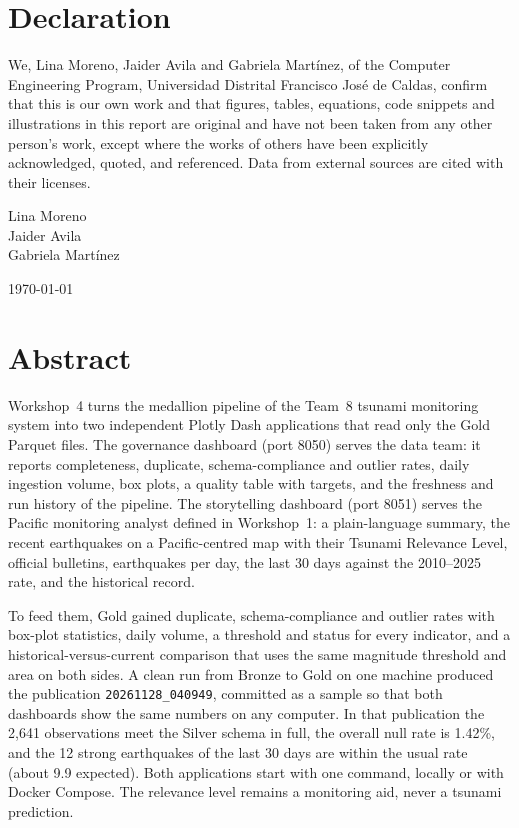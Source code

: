 \documentclass[a4paper,11pt,oneside]{book}
\begin{document}
    \newpage
    \thispagestyle{empty}
    \chapter*{\Large Declaration}
    We, Lina Moreno, Jaider Avila and Gabriela Mart\'inez, of the Computer Engineering Program, Universidad Distrital Francisco Jos\'e de Caldas, confirm that this is our own work and that figures, tables, equations, code snippets and illustrations in this report are original and have not been taken from any other person's work, except where the works of others have been explicitly acknowledged, quoted, and referenced. Data from external sources are cited with their licenses.
    ~\\[1cm]
    \begin{flushright}
    Lina Moreno\\
    Jaider Avila\\
    Gabriela Mart\'inez

    \today
    \end{flushright}

    \chapter*{Abstract}
Workshop~4 turns the medallion pipeline of the Team~8 tsunami monitoring system into two independent Plotly Dash applications that read only the Gold Parquet files. The governance dashboard (port 8050) serves the data team: it reports completeness, duplicate, schema-compliance and outlier rates, daily ingestion volume, box plots, a quality table with targets, and the freshness and run history of the pipeline. The storytelling dashboard (port 8051) serves the Pacific monitoring analyst defined in Workshop~1: a plain-language summary, the recent earthquakes on a Pacific-centred map with their Tsunami Relevance Level, official bulletins, earthquakes per day, the last 30 days against the 2010--2025 rate, and the historical record.

To feed them, Gold gained duplicate, schema-compliance and outlier rates with box-plot statistics, daily volume, a threshold and status for every indicator, and a historical-versus-current comparison that uses the same magnitude threshold and area on both sides. A clean run from Bronze to Gold on one machine produced the publication \texttt{20261128\_040949}, committed as a sample so that both dashboards show the same numbers on any computer. In that publication the 2,641 observations meet the Silver schema in full, the overall null rate is 1.42\%, and the 12 strong earthquakes of the last 30 days are within the usual rate (about 9.9 expected). Both applications start with one command, locally or with Docker Compose. The relevance level remains a monitoring aid, never a tsunami prediction.
\end{document}
